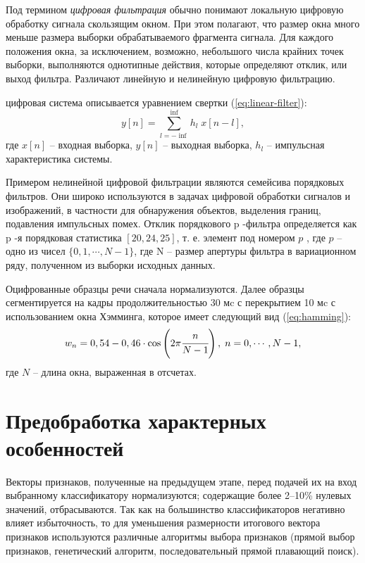Под термином \textit{цифровая фильтрация} обычно понимают локальную цифровую обработку сигнала скользящим окном. При этом полагают, что размер окна много меньше размера выборки обрабатываемого фрагмента сигнала. Для каждого положения окна, за исключением, возможно, небольшого числа крайних точек выборки, выполняются однотипные действия, которые определяют отклик, или выход фильтра. Различают линейную и нелинейную цифровую фильтрацию. \cite{methodcos}

 цифровая система описывается уравнением свертки (\ref{eq:linear-filter}):
\begin{equation}\label{eq:linear-filter}
    y[n] = \sum_{l = -\inf}^{\inf} h_l\;x[n - l],
\end{equation}
где $x[n]$ -- входная выборка, $y[n]$ -- выходная выборка, $h_l$ – импульсная
характеристика системы.

Примером нелинейной цифровой фильтрации являются семейсива порядковых фильтров. Они широко используются в задачах цифровой обработки сигналов и изображений, в частности для обнаружения объектов, выделения границ, подавления импульсных помех. Отклик порядкового p -фильтра определяется как p -я порядковая статистика $[20, 24, 25]$, т. е. элемент под номером $p$ , где $p$ -- одно из чисел $\{0, 1, \cdots, N - 1\}$, где N – размер апертуры фильтра в вариационном ряду, полученном из выборки исходных данных.

Оцифрованные образцы речи сначала нормализуются. Далее образцы сегментируется на кадры продолжительностью 30 мc с перекрытием 10 мc с использованием окна Хэмминга, которое имеет следующий вид (\ref{eq:hamming}):
\begin{equation}\label{eq:hamming}
    w_n = 0,54 - 0,46\cdot\cos\left( 2\pi \cfrac{n}{N - 1}\right),\;n = 0,\cdots,N-1,
\end{equation}
где $N$ -- длина окна, выраженная в отсчетах.
\section{Предобработка характерных особенностей}
Векторы признаков, полученные на предыдущем этапе, перед подачей их на вход выбранному классификатору нормализуются; содержащие более 2–10\% нулевых значений, отбрасываются. \cite{speechrecog} Так как на большинство классификаторов негативно влияет избыточность, то для уменьшения размерности итогового вектора признаков используются различные алгоритмы выбора признаков (прямой выбор признаков, генетический алгоритм, последовательный прямой плавающий поиск).

